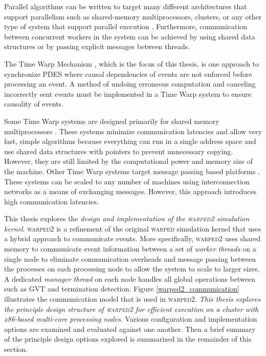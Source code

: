 \documentclass[11pt]{book}
\begin{document}
Parallel algorithms can be written to target many different architectures that support parallelism
such as shared-memory multiprocessors, clusters, or any other type of system that support parallel
execution \cite{culler-97,patterson-11}.  Furthermore, communication between concurrent workers in
the system can be achieved by using shared data structures or by passing explicit messages between
threads.

The Time Warp Mechanism \cite{jefferson-85,fujimoto-90}, which is the focus of this thesis, is one
approach to synchronize PDES where causal dependencies of events are not enforced before processing
an event.  A method of undoing erroneous computation and canceling incorrectly sent events must be
implemented in a Time Warp system to ensure causality of events.

Some Time Warp systems are designed primarily for shared memory multiprocessors \cite{das-94}.
These systems minimize communication latencies and allow very fast, simple algorithms because
everything can run in a single address space and use shared data structures with pointers to
prevent unnecessary copying.  However, they are still limited by the computational power and memory
size of the machine.  Other Time Warp systems target message passing based platforms
\cite{carothers-00,ramanan-98-iscope}.  These systems can be scaled to any number of machines using
interconnection networks as a means of exchanging messages.  However, this approach introduces high
communication latencies.

This thesis explores the \emph{design and implementation of the \textsc{warped2} simulation kernel}.
\textsc{warped2} is a refinement of the original \textsc{warped} simulation kernel
\cite{martin-96,ramanan-98-iscope} that uses a hybrid approach to communicate events.  More
specifically, \textsc{warped2} uses shared memory to communicate event information between a set of
\emph{worker threads} on a single node to eliminate communication overheads and message passing
between the processes on each processing node to allow the system to scale to larger sizes.  A
dedicated \emph{manager thread} on each node handles all global operations between such as GVT and
termination detection.  Figure \ref{warped2_communication} illustrates the communication model that
is used in \textsc{warped2}.  \emph{This thesis explores the principle design structure of
\textsc{warped2} for efficient execution on a cluster with x86-based multi-core processing nodes}.
Various configuration and implementation options are examined and evaluated against one another.
Then a brief summary of the principle design options explored is summarized in the remainder of this
section.
\end{document}
